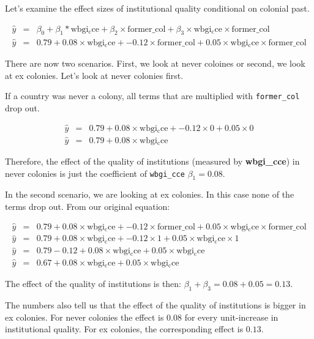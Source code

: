 \documentclass[]{article}
\theoremstyle{definition}
\theoremstyle{definition}
\theoremstyle{definition}
\theoremstyle{remark}
\begin{document}
Let's examine the effect sizes of institutional quality conditional on
colonial past.

\begin{align}
\hat{y} & = & \beta_{0} + \beta_{1} * \mathrm{wbgi_cce} + \beta_{2} \times \mathrm{former\_col} + \beta_{3} \times \mathrm{wbgi_cce} \times \mathrm{former\_col} \\
\hat{y} & = & 0.79 + 0.08 \times \mathrm{wbgi_cce}  + -0.12 \times \mathrm{former\_col} + 0.05 \times \mathrm{wbgi_cce} \times \mathrm{former\_col} 
\end{align}

There are now two scenarios. First, we look at never coloines or second,
we look at ex colonies. Let's look at never colonies first.

If a country was never a colony, all terms that are multiplied with
\texttt{former\_col} drop out.

\begin{align}
\hat{y} & = & 0.79 + 0.08 \times \mathrm{wbgi_cce} + -0.12 \times 0  + 0.05 \times 0  \\
\hat{y} & = & 0.79 + 0.08 \times \mathrm{wbgi_cce}
\end{align}

Therefore, the effect of the quality of institutions (measured by
\textbf{wbgi\_cce}) in never colonies is just the coefficient of
\texttt{wbgi\_cce} \(\beta_1 = 0.08\).

In the second scenario, we are looking at ex colonies. In this case none
of the terms drop out. From our original equation:

\begin{align}
\hat{y} & = & 0.79 + 0.08 \times \mathrm{wbgi_cce} + -0.12 \times \mathrm{former\_col} + 0.05 \times \mathrm{wbgi_cce} \times \mathrm{former\_col} \\
\hat{y} & = & 0.79 + 0.08 \times \mathrm{wbgi_cce} + -0.12 \times 1  + 0.05 \times \mathrm{wbgi_cce} \times 1 \\
\hat{y} & = & 0.79 -0.12 + 0.08 \times \mathrm{wbgi_cce} + 0.05 \times \mathrm{wbgi_cce} \\
\hat{y} & = & 0.67 + 0.08 \times \mathrm{wbgi_cce} + 0.05 \times \mathrm{wbgi_cce}
\end{align}

The effect of the quality of institutions is then:
\(\beta_1 + \beta_3 = 0.08 + 0.05 = 0.13\).

The numbers also tell us that the effect of the quality of institutions
is bigger in ex colonies. For never colonies the effect is \(0.08\) for
every unit-increase in institutional quality. For ex colonies, the
corresponding effect is \(0.13\).
\end{document}
